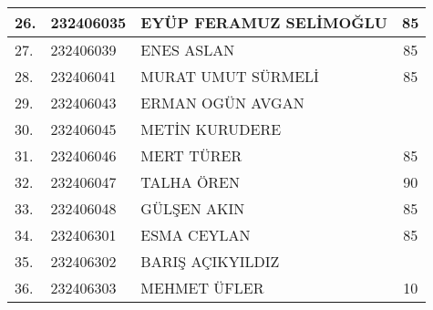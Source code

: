 \documentclass{article}
\begin{document}
\begin{tabular}{|l|l|l|c|}
26.& 232406035& EYÜP FERAMUZ SELİMOĞLU& 85\\\hline
27.& 232406039& ENES ASLAN& 85\\\hline
28.& 232406041& MURAT UMUT SÜRMELİ& 85\\\hline
29.& 232406043& ERMAN OGÜN AVGAN& \\\hline
30.& 232406045& METİN KURUDERE& \\\hline
31.& 232406046& MERT TÜRER& 85\\\hline
32.& 232406047& TALHA ÖREN& 90\\\hline
33.& 232406048& GÜLŞEN AKIN& 85\\\hline
34.& 232406301& ESMA CEYLAN& 85\\\hline
35.& 232406302& BARIŞ AÇIKYILDIZ& \\\hline
36.& 232406303& MEHMET ÜFLER& 10\\\hline
\end{tabular}
\end{document}
